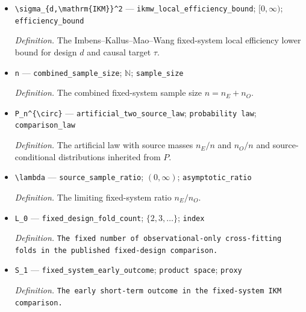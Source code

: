 \documentclass{article}
\begin{document}
\begin{itemize}
  \par\smallskip\noindent\emph{Definition.} The identified designwise observed-data bridge contrast \(\theta_d(P)=\mu_{d,1}-\mu_{d,0}\). It equals the causal target only under an additional common-identification condition.
  \item \texttt{\textbackslash{}\allowbreak{}sigma\_\allowbreak{}\{d,\allowbreak{}\textbackslash{}\allowbreak{}mathrm\{IKM\}\allowbreak{}\}\allowbreak{}\textasciicircum{}2} --- \texttt{ikmw\_\allowbreak{}local\_\allowbreak{}efficiency\_\allowbreak{}bound}; \([0,\infty)\); \texttt{efficiency\_\allowbreak{}bound}
  \par\smallskip\noindent\emph{Definition.} The Imbens--Kallus--Mao--Wang fixed-system local efficiency lower bound for design \(d\) and causal target \(\tau\).
  \item \texttt{n} --- \texttt{combined\_\allowbreak{}sample\_\allowbreak{}size}; \(\mathbb N\); \texttt{sample\_\allowbreak{}size}
  \par\smallskip\noindent\emph{Definition.} The combined fixed-system sample size \(n=n_E+n_O\).
  \item \texttt{P\_\allowbreak{}n\textasciicircum{}\{\textbackslash{}\allowbreak{}circ\}\allowbreak{}} --- \texttt{artificial\_\allowbreak{}two\_\allowbreak{}source\_\allowbreak{}law}; \texttt{probability law}; \texttt{comparison\_\allowbreak{}law}
  \par\smallskip\noindent\emph{Definition.} The artificial law with source masses \(n_E/n\) and \(n_O/n\) and source-conditional distributions inherited from \(P\).
  \item \texttt{\textbackslash{}\allowbreak{}lambda} --- \texttt{source\_\allowbreak{}sample\_\allowbreak{}ratio}; \((0,\infty)\); \texttt{asymptotic\_\allowbreak{}ratio}
  \par\smallskip\noindent\emph{Definition.} The limiting fixed-system ratio \(n_E/n_O\).
  \item \texttt{L\_\allowbreak{}0} --- \texttt{fixed\_\allowbreak{}design\_\allowbreak{}fold\_\allowbreak{}count}; \(\{2,3,\ldots\}\); \texttt{index}
  \par\smallskip\noindent\emph{Definition.} \texttt{The fixed number of observational-\allowbreak{}only cross-\allowbreak{}fitting folds in the published fixed-\allowbreak{}design comparison.}
  \item \texttt{S\_\allowbreak{}1} --- \texttt{fixed\_\allowbreak{}system\_\allowbreak{}early\_\allowbreak{}outcome}; \texttt{product space}; \texttt{proxy}
  \par\smallskip\noindent\emph{Definition.} \texttt{The early short-\allowbreak{}term outcome in the fixed-\allowbreak{}system IKM comparison.}

\end{itemize}
\end{document}
